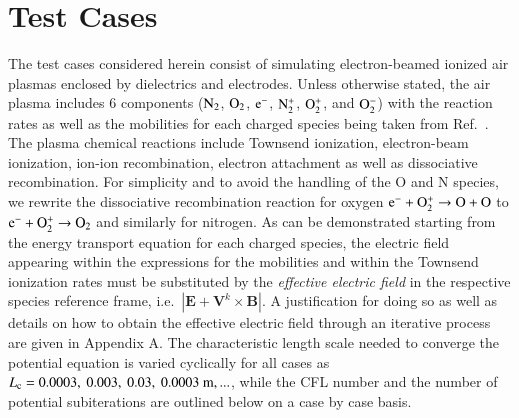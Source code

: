 \documentclass[twoside,onecolumn,10pt]{waflarticle}
\renewcommand{\vec}[1]{\bm{#1}}
\renewcommand{\vec}[1]{\bm{ #1 }}
\begin{document}
\section{Test Cases}

The test cases considered herein consist of simulating electron-beamed ionized air plasmas enclosed by dielectrics and electrodes. Unless otherwise stated, the air plasma includes 6 components ($\rm N_2$, $\rm O_2$, $\rm e^-$, $\rm N_2^+$, $\rm O_2^+$, and $\rm O_2^-$) with the reaction rates  as well as the mobilities for each charged species being taken from Ref.\ \cite{jcp:2014:parent}. The plasma chemical reactions include Townsend ionization, electron-beam ionization, ion-ion recombination, electron attachment as well as dissociative recombination. For simplicity and to avoid the handling of the O and N species, we rewrite the dissociative recombination reaction for oxygen $\rm e^- + O_2^+ \rightarrow O+O$ to $\rm e^- + O_2^+ \rightarrow O_2$ and similarly for nitrogen. As can be demonstrated starting from the energy transport equation for each charged species, the electric field appearing within the expressions for the mobilities and within the Townsend ionization rates must be substituted by the \emph{effective electric field} in the respective species reference frame, i.e.\ $|\vec{E}+\vec{V}^k \times \vec{B}|$. A justification for doing so as well as details on how to obtain the effective electric field through an iterative process are given in Appendix A. The characteristic length scale needed to converge the potential equation is varied cyclically for all cases as  $L_{\rm c}=0.0003,~0.003,~0.03,~0.0003~{\rm m},...$, while the CFL number and the number of potential subiterations  are outlined below on a case by case basis.  
\end{document}
